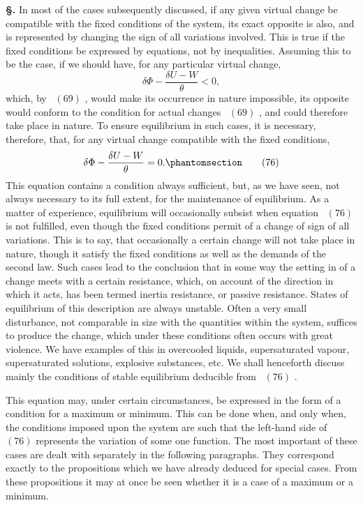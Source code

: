 \documentclass[12pt]{book}[2005/09/16]
\newcommand{\Chg}[2]{#2}
\newcommand{\Add}[1]{\Chg{}{#1}}
\newcommand{\Section}[1]{
  \medskip\par\textbf{§\;#1}
  \label{section:#1}
}
\newcommand{\Tag}[1]{%
  \phantomsection\label{eqn:#1}\tag*{\ensuremath{#1}}%
}
\newcommand{\Eq}[1]{%
  \hyperref[eqn:#1]{\ensuremath{#1}}%
}
\newcommand{\PageSep}[1]{\ignorespaces}
\begin{document}
\Section{149.} In most of the cases subsequently discussed, if any
given virtual change be compatible with the fixed conditions
of the system, its exact opposite is also, and is
represented by changing the sign of all variations involved.
This is true if the fixed conditions be expressed by equations,
not by inequalities. Assuming this to be the case,
if we should have, for any particular virtual change,
\[
\delta\Phi - \frac{\delta U - W}{\theta} < 0,
\]
\PageSep{116}
which, by~\Eq{(69)}, would make its occurrence in nature impossible,
its opposite would conform to the condition for
actual changes~\Eq{(69)}, and could therefore take place in
nature. To ensure equilibrium in such cases, it is necessary,
therefore, that, for any virtual change compatible with the
fixed conditions,
\[
\delta\Phi - \frac{\delta U - W}{\theta} = 0\Add{.}
\Tag{(76)}
\]
This equation contains a condition always sufficient, but, as
we have seen, not always necessary to its full extent, for the
maintenance of equilibrium. As a matter of experience,
equilibrium will occasionally subsist when equation~\Eq{(76)} is
not fulfilled, even though the fixed conditions permit of a
change of sign of all variations. This is to say, that
occasionally a certain change will not take place in nature,
though it satisfy the fixed conditions as well as the demands
of the second law. Such cases lead to the conclusion that
in some way the setting in of a change meets with a certain
resistance, which, on account of the direction in which it
acts, has been termed inertia resistance, or passive resistance.
%
%
States of equilibrium of this description are always
unstable. Often a very small disturbance, not comparable
in size with the quantities within the system, suffices to
produce the change, which under these conditions often
occurs with great violence. We have examples of this in
overcooled liquids, supersaturated vapour, supersaturated
solutions, explosive substances, etc. We shall henceforth
discuss mainly the conditions of stable equilibrium deducible
from~\Eq{(76)}.

This equation may, under certain circumstances, be
expressed in the form of a condition for a maximum or
minimum. This can be done when, and only when, the
conditions imposed upon the system are such that the left-hand
side of~\Eq{(76)} represents the variation of some one
function. The most important of these cases are dealt with
separately in the following paragraphs. They correspond
exactly to the propositions which we have already deduced
\PageSep{117}
for special cases. From these propositions it may at once
be seen whether it is a case of a maximum or a minimum.
\end{document}
